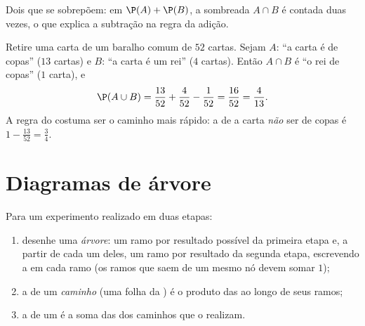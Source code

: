 \begin{omfigure}

{\small Dois  que se sobrepõem: em $\P(A) + \P(B)$, a 
sombreada $A \cap B$ é contada duas vezes, o que explica a subtração na
regra da adição.}
\end{omfigure}

\begin{example}\label{ex:g10:proba:cards}
Retire uma carta de um baralho comum de $52$ cartas. Sejam $A$: ``a carta
é de copas'' ($13$ cartas) e $B$: ``a carta é um rei'' ($4$ cartas).
Então $A \cap B$ é ``o rei de copas'' ($1$ carta), e
\[
\P(A \cup B) = \frac{13}{52} + \frac{4}{52} - \frac{1}{52} = \frac{16}{52}
= \frac{4}{13}.
\]
A regra do  costuma ser o caminho mais rápido: a
 de a carta \emph{não} ser de copas é
$1 - \frac{13}{52} = \frac34$.
\end{example}

\section{Diagramas de árvore}

\begin{method}\label{met:g10:proba:tree}
Para um experimento realizado em duas etapas:
\begin{enumerate}
  \item desenhe uma \emph{árvore}: um ramo por
        resultado possível da primeira etapa e, a partir de cada um
        deles, um ramo por resultado da segunda etapa, escrevendo a
         em cada ramo (os ramos que saem de um mesmo nó
        devem somar $1$);
  \item a  de um \emph{caminho} (uma folha da ) é o
        produto das  ao longo de seus ramos;
  \item a  de um  é a soma das  dos
        caminhos que o realizam.
\end{enumerate}
\end{method}

